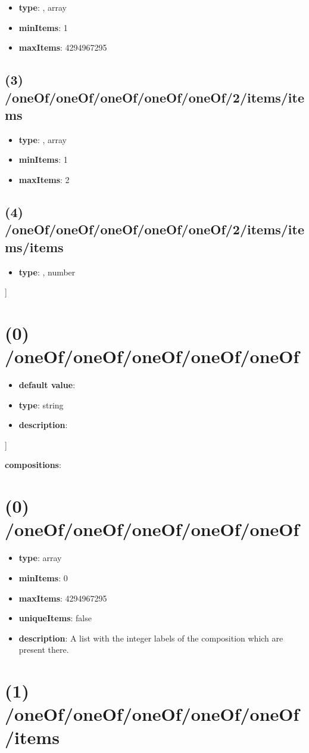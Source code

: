 \begin{itemize}[leftmargin=2em]\item {\bf type}: , array\item {\bf minItems}: 1
\item {\bf maxItems}: 4294967295
\end{itemize}\subsection{(3) /oneOf/oneOf/oneOf/oneOf/oneOf/2/items/items}
\begin{itemize}[leftmargin=3em]\item {\bf type}: , array\item {\bf minItems}: 1
\item {\bf maxItems}: 2
\end{itemize}\subsection{(4) /oneOf/oneOf/oneOf/oneOf/oneOf/2/items/items/items}
\begin{itemize}[leftmargin=4em]\item {\bf type}: , number\end{itemize}]\section{(0) /oneOf/oneOf/oneOf/oneOf/oneOf}
\begin{itemize}[leftmargin=0em]\item {\bf default value}: 
\item {\bf type}: string
\item {\bf description}: 
\end{itemize}]\item {\bf compositions}: \section{(0) /oneOf/oneOf/oneOf/oneOf/oneOf}
\begin{itemize}[leftmargin=0em]\item {\bf type}: array
\item {\bf minItems}: 0
\item {\bf maxItems}: 4294967295
\item {\bf uniqueItems}: false
\item {\bf description}: A list with the integer labels of the composition which are present there.
\end{itemize}\section{(1) /oneOf/oneOf/oneOf/oneOf/oneOf/items}
